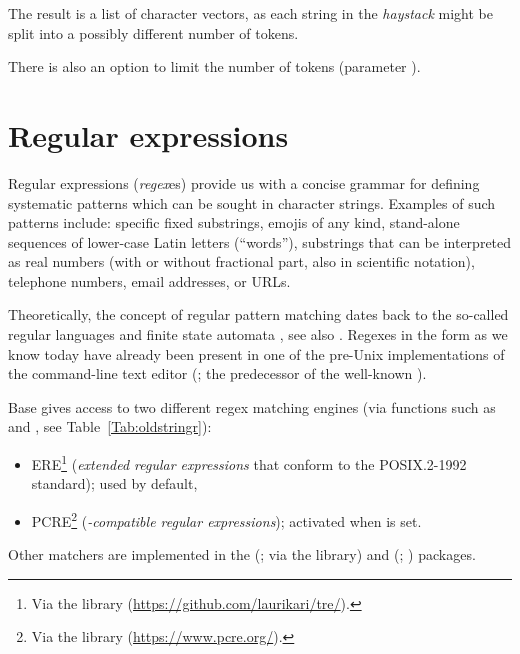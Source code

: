 \documentclass[nojss]{jss}
\begin{document}
The result is a list of character vectors, as each string
in the \textit{haystack}
might be split into a possibly different number of tokens.

There is also an option to limit the number of tokens
(parameter ).










\section{Regular expressions}\label{Sec:regex}

Regular expressions (\textit{regex}es) provide us with a concise
grammar for defining systematic patterns which can be sought in character
strings. Examples of such patterns include:
specific fixed substrings,
emojis of any kind,
stand-alone sequences of lower-case Latin letters (``words''),
substrings that can be interpreted as real numbers (with or without fractional part, also in scientific notation),
telephone numbers,
email addresses, or
URLs.

Theoretically, the concept of regular pattern matching
dates back to the so-called regular languages and finite state
automata \citep{kleene},
see also \citep{hopcroftullman,automata}.
Regexes in the form as we know today have already been present
in one of the pre-Unix implementations of the command-line text
editor  (\citealp{qed}; the predecessor of the well-known ).

Base   gives access to two different regex matching engines
(via functions such as  and ,
see Table~\ref{Tab:oldstringr}):
\begin{itemize}
\item {ERE}\footnote{Via the  library
(\url{https://github.com/laurikari/tre/}).}
(\textit{extended regular expressions} that conform
to the POSIX.2-1992 standard);
used by default,
\item {PCRE}\footnote{Via the 
library (\url{https://www.pcre.org/}).}
(\textit{-compatible regular expressions});
activated when  is set.
\end{itemize}
Other matchers are implemented in the 
(\citealp{ore}; via the  library)
and  (\citealp{re2r}; ) packages.
\end{document}
